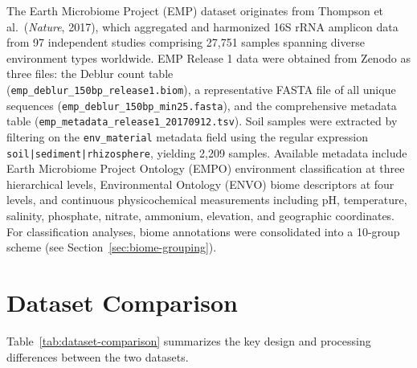 \documentclass[12pt, oneside]{report}
\begin{document}
The Earth Microbiome Project (EMP) dataset originates from Thompson et al.\
(\textit{Nature}, 2017)\cite{thompson2017}, which aggregated and harmonized 16S rRNA amplicon data from
97 independent studies comprising 27,751 samples spanning diverse environment types
worldwide. EMP Release 1 data were obtained from Zenodo as three files: the Deblur count
table
\\
(\texttt{emp\_deblur\_150bp\_release1.biom}), a representative FASTA file of all unique
sequences (\texttt{emp\_deblur\_150bp\_min25.fasta}), and the comprehensive metadata table
(\texttt{emp\_metadata\_release1\_20170912.tsv}). Soil samples were extracted by filtering on
the \texttt{env\_material} metadata field using the regular expression
\\
\texttt{soil|sediment|rhizosphere}, yielding 2,209 samples. Available metadata include Earth
Microbiome Project Ontology (EMPO) environment classification at three hierarchical levels,
Environmental Ontology (ENVO) biome descriptors at four levels, and continuous
physicochemical measurements including pH, temperature, salinity, phosphate, nitrate,
ammonium, elevation, and geographic coordinates. For classification analyses, biome
annotations were consolidated into a 10-group scheme (see Section~\ref{sec:biome-grouping}).


\section{Dataset Comparison}

Table~\ref{tab:dataset-comparison} summarizes the key design and processing differences
between the two datasets.
\end{document}
